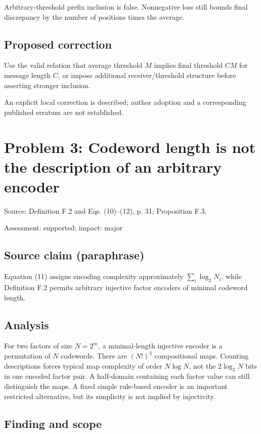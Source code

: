 \documentclass[11pt]{article}
\begin{document}
Arbitrary-threshold prefix inclusion is false. Nonnegative loss still bounds final discrepancy by the number of positions times the average.

\subsection*{Proposed correction}

Use the valid relation that average threshold \(M\) implies final threshold \(CM\) for message length \(C\), or impose additional receiver/threshold structure before asserting stronger inclusion.

An explicit local correction is described; author adoption and a corresponding published erratum are not established.

\section*{Problem 3: Codeword length is not the description of an arbitrary encoder}

Source: Definition F.2 and Eqs. (10)–(12), p. 31; Proposition F.3.

Assessment: supported; impact: major

\subsection*{Source claim (paraphrase)}

Equation (11) assigns encoding complexity approximately \(\sum_i\log_2N_i\), while Definition F.2 permits arbitrary injective factor encoders of minimal codeword length.

\subsection*{Analysis}

For two factors of size \(N=2^m\), a minimal-length injective encoder is a permutation of \(N\) codewords. There are \((N!)^2\) compositional maps. Counting descriptions forces typical map complexity of order \(N\log N\), not the \(2\log_2N\) bits in one encoded factor pair. A half-domain containing each factor value can still distinguish the maps. A fixed simple rule-based encoder is an important restricted alternative, but its simplicity is not implied by injectivity.

\subsection*{Finding and scope}
\end{document}
